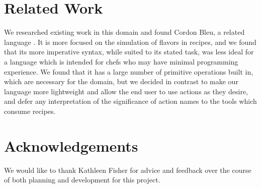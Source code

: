 \documentclass[pldi]{sigplanconf-pldi15}
\begin{document}
\section{Related Work}
We researched existing work in this domain and found Cordon Bleu, a related
language \cite{cordonbleu}. It is more focused on the simulation of flavors
in recipes, and we found that its more imperative syntax, while suited to its
stated task, was less ideal for a language which is intended for chefs who
may have minimal programming experience. We found that it has a large number
of primitive operations built in, which are necessary for the domain, but we
decided in contrast to make our language more lightweight and allow the end
user to use actions as they desire, and defer any interpretation of the
significance of action names to the tools which consume recipes.

\section{Acknowledgements}
We would like to thank Kathleen Fisher for advice and feedback over the course
of both planning and development for this project.



\nocite{*}
\end{document}
